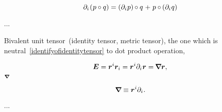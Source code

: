 \begin{otherlanguage}{russian}

\nopagebreak\vspace{-0.4em}\begin{equation}\label{productrulefordifferentiation}
\partial_i \hspace{-0.2ex} \left( \hspace{.1ex} p \circ q \right)
= \left( \partial_i \hspace{.1ex} p \right) \hspace{-0.12ex} \circ q \hspace{.16ex} +
\hspace{.16ex} p \circ \hspace{-0.12ex} \left( \partial_i \hspace{.1ex} q \right)
\end{equation}

...

Bivalent unit tensor~(identity tensor,  metric tensor), the one which is neutral~\eqref{identifyofidentitytensor} to dot product operation,

\nopagebreak\vspace{-0.1em}\begin{equation}
\bm{E} = \bm{r}^i \bm{r}_i = \tikzmark{beginOriginOfNabla} \bm{r}^i \partial_i \tikzmark{endOriginOfNabla} \hspace{.1ex} \bm{r} = \hspace{-0.16ex} \boldnabla \bm{r} ,
\end{equation}
%
{${\scriptstyle \bm{\nabla}\hspace{-0.2ex}}$}

\vspace{-0.4em} \noindent {} 

\nopagebreak\vspace{-0.1em}\begin{equation}
\bm{\nabla}\hspace{-0.2ex} \equiv \bm{r}^i \partial_i \hspace{.1ex} .
\end{equation}

...

  


\end{otherlanguage}

